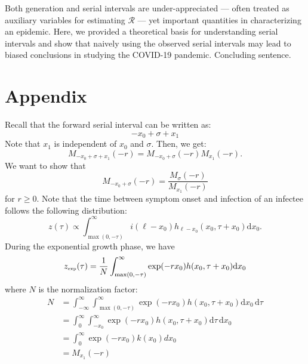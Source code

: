 \documentclass[12pt]{article}
\begin{document}
Both generation and serial intervals are under-appreciated --- often treated as auxiliary variables for estimating $\mathcal R$ --- yet important quantities in characterizing an epidemic.
Here, we provided a theoretical basis for understanding serial intervals and show that naively using the observed serial intervals may lead to biased conclusions in studying the COVID-19 pandemic.
Concluding sentence.

\pagebreak

\section*{Appendix}

Recall that the forward serial interval can be written as:
\begin{equation}
- x_0 + \sigma + x_1
\end{equation}
Note that $x_1$ is independent of $x_0$ and $\sigma$. Then, we get:
\begin{equation}
M_{- x_0 + \sigma + x_1}(-r) = M_{- x_0 + \sigma}(-r) M_{x_1}(-r).
\end{equation}
We want to show that 
\begin{equation}
M_{- x_0 + \sigma}(-r)= \frac{M_\sigma(-r)}{M_{x_1}(-r)}
\end{equation}
for $r \geq 0$.
Note that the time between symptom onset and infection of an infectee follows the following distribution:
\begin{equation}
z(\tau) \propto \int_{\max(0, -\tau)}^\infty i(\ell - x_0) h_{\ell - x_0}(x_0, \tau+x_0) \mathrm{d} x_0.
\end{equation}
During the exponential growth phase, we have
\begin{equation}
\begin{aligned}
z_{\textrm{\tiny exp}}(\tau) &= \frac{1}{N} \int_{\max(0, -\tau)}^\infty \exp(- r x_0) h(x_0, \tau+x_0) \mathrm{d} x_0\\
\end{aligned}
\end{equation}
where $N$ is the normalization factor:
\begin{equation}
\begin{aligned}
N &= \int_{-\infty}^\infty \int_{\max(0, -\tau)}^\infty \exp(- r x_0) h(x_0, \tau+x_0) \mathrm{d} x_0\,\mathrm{d}\tau\\
&= \int_{0}^\infty \int_{-x_0}^\infty \exp(- r x_0) h(x_0, \tau+x_0) \mathrm{d}\tau\,\mathrm{d} x_0\\
&= \int_{0}^\infty \exp(- r x_0) k(x_0) dx_0\\
&= M_{x_1}(-r)
\end{aligned}
\end{equation}
\end{document}
